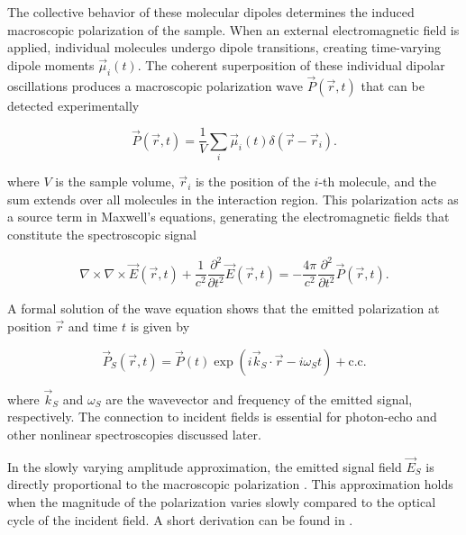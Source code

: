 \noindent 
The collective behavior of these molecular dipoles determines the induced macroscopic polarization of the sample. When an external electromagnetic field is applied, individual molecules undergo dipole transitions, creating time-varying dipole moments $\vec{\mu}_i(t)$. The coherent superposition of these individual dipolar oscillations produces a macroscopic polarization wave $\vec{P}(\vec{r}, t)$ that can be detected experimentally

\begin{equation}
	\vec{P}(\vec{r}, t) = \frac{1}{V} \sum_{i} \vec{\mu}_i(t) \delta(\vec{r} - \vec{r}_i).
	\label{eq:macroscopic_polarization}
\end{equation}

\noindent 
where $V$ is the sample volume, $\vec{r}_i$ is the position of the $i$-th molecule, and the sum extends over all molecules in the interaction region. This polarization acts as a source term in Maxwell's equations, generating the electromagnetic fields that constitute the spectroscopic signal \cite{abramaviciusetal2009coherentmultidimensionaloptical}

\begin{equation}
	\nabla \times \nabla \times \vec{E}(\vec{r}, t) + \frac{1}{c^2} \frac{\partial^2}{\partial t^2} \vec{E}(\vec{r}, t) = - \frac{4 \pi}{c^2} \frac{\partial^2}{\partial t^2} \vec{P}(\vec{r}, t).
\end{equation}

\noindent
A formal solution of the wave equation shows that the emitted polarization at position $\vec{r}$ and time $t$ is given by

\begin{equation} \label{eq:solution_wave_equation}
	\vec{P}_S(\vec{r}, t) = \vec{P}(t) \exp(i \vec{k}_S \cdot \vec{r} - i \omega_S t) + \text{c.c.}
\end{equation}

\noindent
where $\vec{k}_S$ and $\omega_S$ are the wavevector and frequency of the emitted signal, respectively. The connection to incident fields is essential for photon-echo and other nonlinear spectroscopies discussed later. 

\noindent 
In the slowly varying amplitude approximation, the emitted signal field $\vec{E}_S$ is directly proportional to the macroscopic polarization \cite{mukamel1995principlesnonlinearoptical}. This approximation holds when the magnitude of the polarization varies slowly compared to the optical cycle of the incident field. A short derivation can be found in \cite{boyd2008chapter6nonlinear}.

